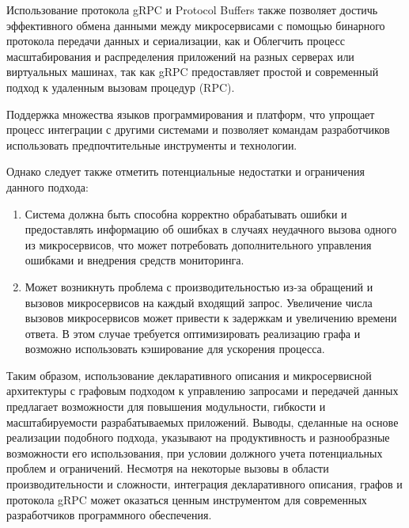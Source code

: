 Использование протокола gRPC и Protocol Buffers также позволяет достичь эффективного обмена данными между микросервисами с помощью бинарного протокола передачи данных и сериализации, как и Облегчить процесс масштабирования и распределения приложений на разных серверах или виртуальных машинах, так как gRPC предоставляет простой и современный подход к удаленным вызовам процедур (RPC).

Поддержка множества языков программирования и платформ, что упрощает процесс интеграции с другими системами и позволяет командам разработчиков использовать предпочтительные инструменты и технологии.

Однако следует также отметить потенциальные недостатки и ограничения данного подхода:
\begin{enumerate}
    \item Система должна быть способна корректно обрабатывать ошибки и предоставлять информацию об ошибках в случаях неудачного вызова одного из микросервисов, что может потребовать дополнительного управления ошибками и внедрения средств мониторинга.
    \item Может возникнуть проблема с производительностью из-за обращений и вызовов микросервисов на каждый входящий запрос. Увеличение числа вызовов микросервисов может привести к задержкам и увеличению времени ответа. В этом случае требуется оптимизировать реализацию графа и возможно использовать кэширование для ускорения процесса.
\end{enumerate}


Таким образом, использование декларативного описания и микросервисной архитектуры с графовым подходом к управлению запросами и передачей данных предлагает возможности для повышения модульности, гибкости и масштабируемости разрабатываемых приложений. Выводы, сделанные на основе реализации подобного подхода, указывают на продуктивность и разнообразные возможности его использования, при условии должного учета потенциальных проблем и ограничений. Несмотря на некоторые вызовы в области производительности и сложности, интеграция декларативного описания, графов и протокола gRPC может оказаться ценным инструментом для современных разработчиков программного обеспечения.